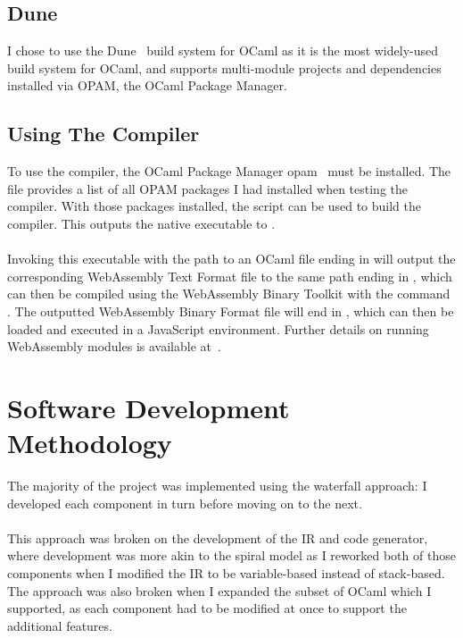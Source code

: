 \subsection{Dune}
I chose to use the Dune~\cite{Dune} build system for OCaml as it is the most widely-used build system for OCaml, and supports multi-module projects and dependencies installed via OPAM, the OCaml Package Manager.

\subsection{Using The Compiler}
To use the compiler, the OCaml Package Manager opam~\cite{Opam} must be installed. The file  provides a list of all OPAM packages I had installed when testing the compiler. With those packages installed, the script  can be used to build the compiler. This outputs the native executable to .
\\\\
Invoking this executable with the path to an OCaml file ending in  will output the corresponding WebAssembly Text Format file to the same path ending in , which can then be compiled using the WebAssembly Binary Toolkit with the command . The outputted WebAssembly Binary Format file will end in , which can then be loaded and executed in a JavaScript environment. Further details on running WebAssembly modules is available at~\cite{Load_wasm}.

\section{Software Development Methodology}
The majority of the project was implemented using the waterfall approach: I developed each component in turn before moving on to the next.
\\\\
This approach was broken on the development of the IR and code generator, where development was more akin to the spiral model as I reworked both of those components when I modified the IR to be variable-based instead of stack-based.
The approach was also broken when I expanded the subset of OCaml which I supported, as each component had to be modified at once to support the additional features.

